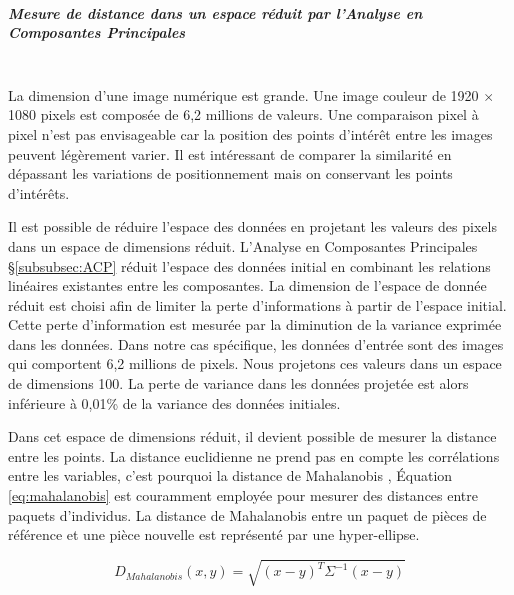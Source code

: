 \subparagraph{Mesure de distance dans un espace réduit par l'Analyse en Composantes Principales}\mbox{} \\
La dimension d'une image numérique est grande.
Une image couleur de 1920 $\times$ 1080 pixels est composée de 6,2 millions de valeurs.
Une comparaison pixel à pixel n'est pas envisageable car la position des points d'intérêt entre les images peuvent légèrement varier.
Il est intéressant de comparer la similarité en dépassant les variations de positionnement mais on conservant les points d'intérêts.

Il est possible de réduire l'espace des données en projetant les valeurs des pixels dans un espace de dimensions réduit.
L'Analyse en Composantes Principales §\ref{subsubsec:ACP} réduit l'espace des données initial en combinant les relations linéaires existantes entre les composantes.
La dimension de l'espace de donnée réduit est choisi afin de limiter la perte d'informations à partir de l'espace initial.
Cette perte d'information est mesurée par la diminution de la variance exprimée dans les données.
Dans notre cas spécifique, les données d'entrée sont des images qui comportent 6,2 millions de pixels.
Nous projetons ces valeurs dans un espace de dimensions 100.
La perte de variance dans les données projetée est alors inférieure à 0,01\% de la variance des données initiales.

Dans cet espace de dimensions réduit, il devient possible de mesurer la distance entre les points.
La distance euclidienne ne prend pas en compte les corrélations entre les variables, c'est pourquoi la distance de Mahalanobis \cite{mahalanobis_generalised_1936}, Équation \ref{eq:mahalanobis}  est couramment employée pour mesurer des distances entre paquets d'individus.
La distance de Mahalanobis entre un paquet de pièces de référence et une pièce nouvelle est représenté par une hyper-ellipse.

\begin{equation} \label{eq:mahalanobis}
D_{Mahalanobis}(x, y)=\sqrt{(x - y)^{T} \Sigma^{-1}(x-y)}
\end{equation}

